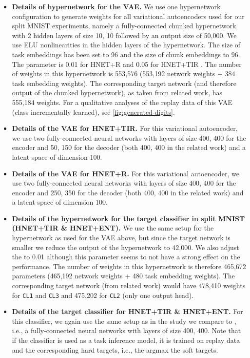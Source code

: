 \documentclass{article}
\begin{document}
\begin{itemize}
    \item \textbf{Details of hypernetwork for the VAE.}
    We use one hypernetwork configuration to generate weights for all variational autoencoders used for our split MNIST experiments, namely a fully-connected chunked hypernetwork with 2 hidden layers of size 10, 10 followed by an output size of 50,000. We use ELU nonlinearities in the hidden layers of the hypernetwork. The size of task embeddings  has been set to 96 and the size of chunk embeddings  to 96. The parameter  is 0.01 for HNET+R and 0.05 for HNET+TIR
. The number of weights in this hypernetwork is 553,576 (553,192 network weights + 384 task embedding weights). The corresponding target network (and therefore output of the chunked hypernetwork), as taken from related work, has 555,184 weights. For a qualitative analyses of the replay data of this VAE (class incrementally learned), see \ref{fig:generated-digits}.
    
    \item \textbf{Details of the VAE for HNET+TIR.} 
    For this variational  autoencoder, we use two
    fully-connected neural networks with layers of size 
    400, 400 for the encoder and 50, 150 for the decoder (both 400, 400 in the related work) and a latent space of dimension 100.
    
    \item \textbf{Details of the VAE for HNET+R.}  For this variational  autoencoder, we use two
    fully-connected neural networks with layers of size 
    400, 400 for the encoder and 250, 350 for the decoder (both 400, 400 in the related work) and a latent space of dimension 100.
    
     \item \textbf{Details of the hypernetwork for the target   classifier in split MNIST (HNET+TIR \& HNET+ENT).} 
     We use the same setup for the hypernetwork as used for the VAE above, but since the target network is smaller we reduce the output of the hypernetwork to 42,000. We also adjust 
     the  to 0.01 although this parameter seems to not have a strong effect on the performance.
      The number of weights in this hypernetwork is therefore 465,672 parameters (465,192 network weights + 480 task embedding weights). The corresponding target network (from related work) would have 478,410 weights for  \texttt{CL1} and  \texttt{CL3} and 475,202 for  \texttt{CL2} (only one output head).
     
     \item \textbf{Details of the target classifier for HNET+TIR \& HNET+ENT.} 
     For this classifier, we again use the same setup as in the study we compare to \citep{van_de_ven_three_2019}, i.e., a fully-connected neural networks with layers of size 400, 400.
     Note that if the classifier is used as a task inference model, it is trained on replay data and the corresponding hard targets, i.e., the argmax the soft targets.
\end{itemize}
\end{document}
